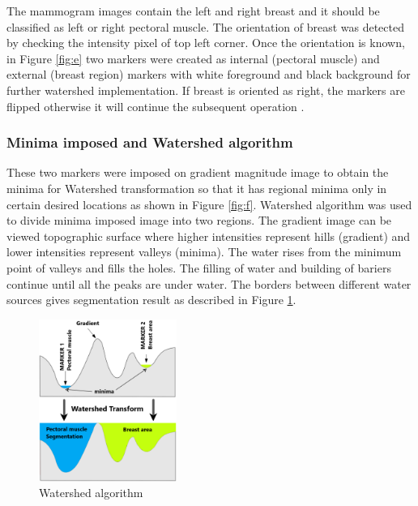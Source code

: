 \documentclass{article}
\begin{document}
The mammogram images contain the left and right breast and it should be classified as left or right pectoral muscle. The orientation of breast was detected by checking the intensity pixel of top left corner. Once the orientation is known, in Figure \ref{fig:e} two markers were created as internal (pectoral muscle) and external (breast region) markers with white foreground and black background for further watershed implementation. If breast is oriented as right, the markers are flipped otherwise it will continue the subsequent operation .

\subsubsection{Minima imposed and Watershed algorithm}
\label{sssec:grad_mag}

These two markers were imposed on gradient magnitude image to obtain the minima for Watershed transformation so that it has regional minima only in certain desired locations as shown in Figure \ref{fig:f}. \cite{6} Watershed algorithm was used to divide minima imposed image into two regions. The gradient image can be viewed topographic surface where higher intensities represent hills (gradient) and lower intensities represent valleys (minima). The water rises from the minimum point of valleys and fills the holes. \cite{7} The filling of water and building of bariers continue until all the peaks are under water. The borders between different water sources gives segmentation result as described in Figure \ref{fig:watershed}.

 \begin{figure}[h!]
    \centering
    \includegraphics[width=0.40\textwidth]{images/watershed_algorithm.png} 
    \caption{Watershed algorithm}
    \label{fig:watershed}
\end{figure} 
\end{document}
